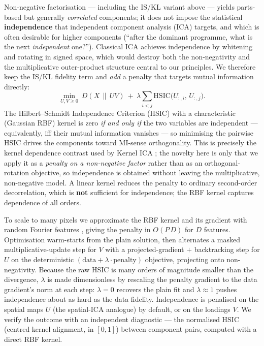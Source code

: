 \documentclass[11pt]{article}
\newcommand{\HSIC}{\mathrm{HSIC}}
\begin{document}
Non-negative factorisation --- including the IS/KL variant above --- yields parts-based but
generally \emph{correlated} components; it does not impose the statistical
\textbf{independence} that independent component analysis (ICA) targets, and which is often
desirable for higher components (``after the dominant programme, what is the next
\emph{independent} one?''). Classical ICA achieves independence by whitening and rotating in
signed space, which would destroy both the non-negativity and the multiplicative
outer-product structure central to our principles. We therefore keep the IS/KL fidelity term
and \emph{add} a penalty that targets mutual information directly:
\begin{equation}
  \min_{U, V \ge 0}\ D(X \,\|\, UV)\ +\ \lambda \sum_{i<j} \HSIC\!\big(U_{:,i},\, U_{:,j}\big).
\end{equation}
The Hilbert--Schmidt Independence Criterion (HSIC) \citep{gretton2005} with a characteristic
(Gaussian RBF) kernel is zero \emph{if and only if} the two variables are independent ---
equivalently, iff their mutual information vanishes --- so minimising the pairwise HSIC
drives the components toward MI-sense orthogonality. This is precisely the kernel dependence
contrast used by Kernel ICA \citep{bach2002}; the novelty here is only that we apply it as a
\emph{penalty on a non-negative factor} rather than as an orthogonal-rotation objective, so
independence is obtained without leaving the multiplicative, non-negative model. A linear
kernel reduces the penalty to ordinary second-order decorrelation, which is \textbf{not}
sufficient for independence; the RBF kernel captures dependence of all orders.

To scale to many pixels we approximate the RBF kernel and its gradient with random Fourier
features \citep{rahimi2007}, giving the penalty in $O(P\,D)$ for $D$ features. Optimisation
warm-starts from the plain solution, then alternates a masked multiplicative-update step for
$V$ with a projected-gradient $+$ backtracking step for $U$ on the deterministic
$(\text{data} + \lambda\cdot\text{penalty})$ objective, projecting onto non-negativity.
Because the raw HSIC is many orders of magnitude smaller than the divergence, $\lambda$ is
made dimensionless by rescaling the penalty gradient to the data gradient's norm at each
step: $\lambda = 0$ recovers the plain fit and $\lambda \approx 1$ pushes independence about
as hard as the data fidelity. Independence is penalised on the spatial maps $U$ (the
spatial-ICA analogue) by default, or on the loadings $V$. We verify the outcome with an
independent diagnostic --- the normalised HSIC (centred kernel alignment, in $[0, 1]$)
between component pairs, computed with a direct RBF kernel.
\end{document}
